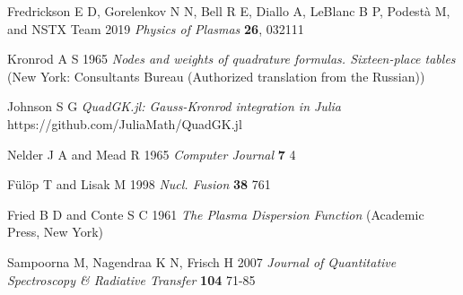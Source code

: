 \documentclass[12pt]{iopart}
\begin{document}
\begin{thebibliography}{9}
Fredrickson E D, Gorelenkov  N N, Bell R E, Diallo A, LeBlanc B P, Podestà  M, and NSTX Team 2019 \textit{Physics of Plasmas} \textbf{26}, 032111

Kronrod A S 1965 \textit{Nodes and weights of quadrature formulas. Sixteen-place tables} (New York: Consultants Bureau (Authorized translation from the Russian))

Johnson S G \textit{QuadGK.jl: Gauss-Kronrod integration in Julia} https://github.com/JuliaMath/QuadGK.jl

Nelder J A and Mead R 1965 \textit{Computer Journal} \textbf{7} 4

F{\"u}l{\"o}p T and Lisak M 1998 \textit{Nucl. Fusion} \textbf{38} 761

Fried B D and Conte S C 1961 \textit{The Plasma Dispersion Function} (Academic Press, New York)

Sampoorna M, Nagendraa K N, Frisch H 2007 \textit{Journal of Quantitative Spectroscopy \& Radiative Transfer} \textbf{104} 71-85


\end{thebibliography}
\end{document}
